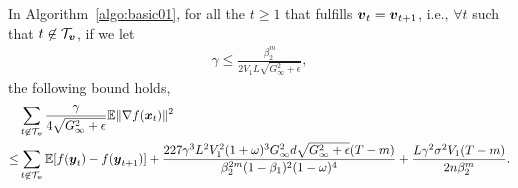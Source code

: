 \begin{lemma}
\label{lemma:reuse_step}
In Algorithm~\ref{algo:basic01},
for all the $t\geq 1$ that fulfills $\boldsymbol{v}_t=\boldsymbol{v}_{t+1}$, i.e., $\forall t$ such that $t\not\in\mathcal{T}_{\boldsymbol{v}}$, 
if we let
\begin{align*}
    \gamma \leq \frac{\beta_2^m}{2V_1L\sqrt{G_\infty^2+\epsilon}},
\end{align*}
the following bound holds,
\begin{align*}
    & \sum_{t\not\in\mathcal{T}_{\boldsymbol{v}}}\frac{\gamma}{4\sqrt{G_\infty^2+\epsilon}}\mathbb{E}\|\nabla f(\boldsymbol{x}_t)\|^2 \\
\leq & \sum_{t\not\in\mathcal{T}_{\boldsymbol{v}}}\mathbb{E}[f(\boldsymbol{y}_{t}) - f(\boldsymbol{y}_{t+1})]+ \frac{227\gamma^3L^2V_1^2(1+\omega)^3G_\infty^2d\sqrt{G_\infty^2+\epsilon}(T-m)}{\beta_2^{2m}(1-\beta_1)^2(1-\omega)^4} + \frac{L\gamma^2\sigma^2V_1(T-m)}{2n\beta_2^m}.
\end{align*}
\end{lemma}
